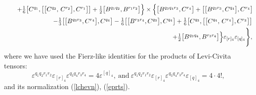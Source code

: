 \documentclass[10pt]{article}
\begin{document}
\begin{eqnarray}
&& \quad
+\textstyle\frac{1}{6}\big[C^{q_1},\big[\big[C^{q_2},\,C^{r_2}\big] , C^{r_1}\big]\big]  +
 \textstyle\frac{1}{2}
\big[B^{q_1q_2}, B^{r_1r_2}\big] \Big\}\times \Big\{\big[B^{q_3q_4r_3},C^{r_4}\big]+\big[\big[B^{q_3r_3},C^{q_4}\big],C^{r_4}\big]\hspace{-0.1em} \nonumber \\
&& \quad   -\textstyle\frac{1}{3}\big[\big[B^{q_3r_3},C^{r_4}\big],C^{q_4}\big]- \textstyle\frac{1}{6}\big[\big[B^{r_3r_4},C^{q_3}\big],C^{q_4}\big]+\textstyle\frac{1}{6}\big[C^{q_3},\big[\big[C^{q_4},\,C^{r_4}\big] , C^{r_3}\big]\big]
\nonumber \\
&& \quad +
 \textstyle\frac{1}{2}
\big[B^{q_3q_4}, B^{r_3r_4}\big] \Big\}\varepsilon_{[r]_4}\varepsilon_{[q]_4} \Bigg\}, \label{yb4presfin1}
  \end{eqnarray}
  where we have used the Fierz-like identities for the products of Levi-Civita tensors:
  \begin{equation}\label{Firtz}
\varepsilon^{q_1q_2r_1r_2}\varepsilon_{[r]_4}\varepsilon^{q_3q_4r_3r_4} = 4 \varepsilon^{[q]_4}, \ \mathrm{and} \ \varepsilon^{q_1q_2r_1r_2}\varepsilon_{[r]_4}\varepsilon^{q_3q_4r_3r_4}\varepsilon_{[q]_4}= 4 \cdot 4!,
  \end{equation}
  and its normalization (\ref{lchevn}), (\ref{eprts}).
\end{document}
